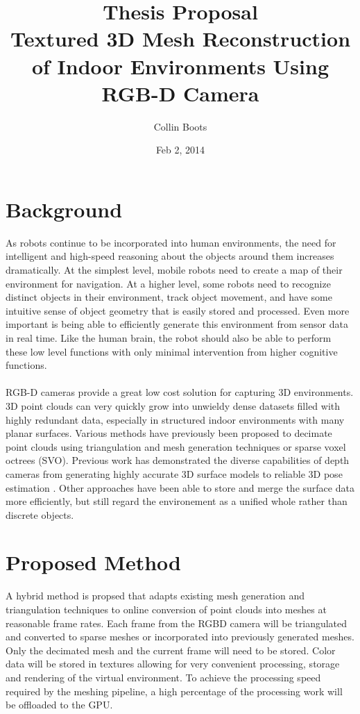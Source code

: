 \documentclass[english]{article}
\title{Thesis Proposal \\Textured 3D Mesh Reconstruction of Indoor Environments Using RGB-D Camera}
\author{Collin Boots}
\date{Feb 2, 2014}
\begin{document}
\maketitle
\section*{Background}
As robots continue to be incorporated into human environments, the need for intelligent and high-speed reasoning about the objects around them increases dramatically. At the simplest level, mobile robots need to create a map of their environment for navigation. At a higher level, some robots need to recognize distinct objects in their environment, track object movement, and have some intuitive sense of object geometry that is easily stored and processed. Even more important is being able to efficiently generate this environment from sensor data in real time. Like the human brain, the robot should also be able to perform these low level functions with only minimal intervention from higher cognitive functions.\\
\\
RGB-D cameras provide a great low cost solution for capturing 3D environments. 3D point clouds can very quickly grow into unwieldy dense datasets filled with highly redundant data, especially in structured indoor environments with many planar surfaces. Various methods have previously been proposed to decimate point clouds using triangulation and mesh generation techniques or sparse voxel octrees (SVO). Previous work has demonstrated the diverse capabilities of depth cameras from generating highly accurate 3D surface models \cite{KinectFusion} to reliable 3D pose estimation \cite{Endres,Taguchi}. Other approaches have been able to store and merge the surface data more efficiently, but still regard the environement as a unified whole rather than discrete objects.

\section*{Proposed Method}
A hybrid method is propsed that adapts existing mesh generation and triangulation techniques to online conversion of point clouds into meshes at reasonable frame rates. Each frame from the RGBD camera will be triangulated and converted to sparse meshes or incorporated into previously generated meshes. Only the decimated mesh and the current frame will need to be stored. Color data will be stored in textures allowing for very convenient processing, storage and rendering of the virtual environment. To achieve the processing speed required by the meshing pipeline, a high percentage of the processing work will be offloaded to the GPU.
\end{document}
